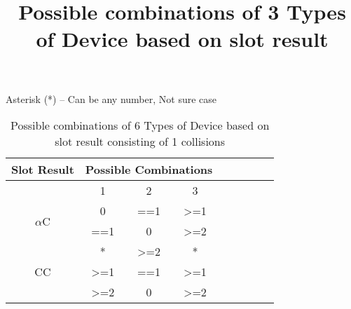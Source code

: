\documentclass[fleqn]{article}
\begin{document}
\title{Possible combinations of 3 Types of Device based on slot result}

\maketitle{}

Asterisk (*) – Can be any number, Not sure case 


\begin{table}[h!]
\centering
\begin{tabular}{|c|c|c|c|c|c|c|c|c|}
\hline
Slot Result & \multicolumn{3}{c|}{Possible Combinations} \\ \hline
 & 1 & 2 & 3 \\ \hline
\multirow{2}{*}{$\alpha$C} & 0 & ==1 & \textgreater{}=1 \\ \cline{2-4} 
 & ==1 & 0 & \textgreater{}=2 \\ \hline
\multirow{3}{*}{CC} & * & \textgreater{}=2 & * \\ \cline{2-4} 
 & \textgreater{}=1 & ==1 & \textgreater{}=1 \\ \cline{2-4} 
 & \textgreater{}=2 & 0 & \textgreater{}=2 \\ \hline
\end{tabular}
\caption{Possible combinations of 6 Types of Device based on slot result consisting of 1 collisions}
\label{Tab8_2C}
\end{table}
\end{document}
